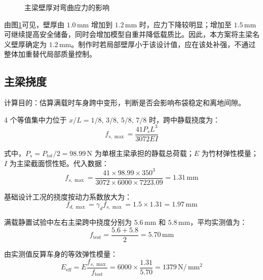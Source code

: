 \documentclass[UTF8,a4paper,12pt,fontset=none]{ctexart}
\numberwithin{equation}{section}
\numberwithin{figure}{section}
\numberwithin{table}{section}
\newcommand{\mm}{\,\mathrm{mm}}
\newcommand{\Nunit}{\,\mathrm{N}}
\begin{document}
\begin{figure}[H]
\centering
{}
\caption{主梁壁厚对弯曲应力的影响}
\label{fig:thickness-sensitivity}
\end{figure}

由图\ref{fig:thickness-sensitivity}可见，壁厚由 $1.0\mm$ 增加到 $1.2\mm$ 时，应力下降较明显；增加至 $1.5\mm$ 可继续提高安全储备，同时会增加模型自重并降低载质比。因此，本方案将主梁名义壁厚确定为 $1.2\mm$。制作时若局部壁厚小于该设计值，应在该处补强，不通过整体加重替代局部质量控制。

\subsection{主梁挠度}
计算目的：估算满载时车身跨中变形，判断是否会影响布袋稳定和离地间隙。

4 个等值集中力位于 $x/L=1/8,\,3/8,\,5/8,\,7/8$ 时，跨中静载挠度为：
\begin{equation}
  f_{s,\max}=\frac{41P_sL^3}{3072EI}
\end{equation}

式中，$P_s=P_{tot}/2=98.99\Nunit$ 为单根主梁承担的静载总荷载；$E$ 为竹材弹性模量；$I$ 为主梁截面惯性矩。代入数据：
\begin{equation}
  f_{s,\max}=\frac{41\times98.99\times350^3}{3072\times6000\times7223.09}=1.31\mm
\end{equation}

基础设计工况的挠度按动力系数放大为：
\begin{equation}
  f_{d,\max}=\gamma_d f_{s,\max}=1.5\times1.31=1.97\mm
\end{equation}

满载静置试验中左右主梁跨中挠度分别为 $5.6\mm$ 和 $5.8\mm$，平均实测值为：
\begin{equation}
  f_{\mathrm{test}}=\frac{5.6+5.8}{2}=5.70\mm
\end{equation}

由实测值反算车身的等效弹性模量：
\begin{equation}
  E_{\mathrm{eff}}=E\frac{f_{s,\max}}{f_{\mathrm{test}}}=6000\times\frac{1.31}{5.70}=1379\Nunit/\mm^2
\end{equation}
\end{document}
